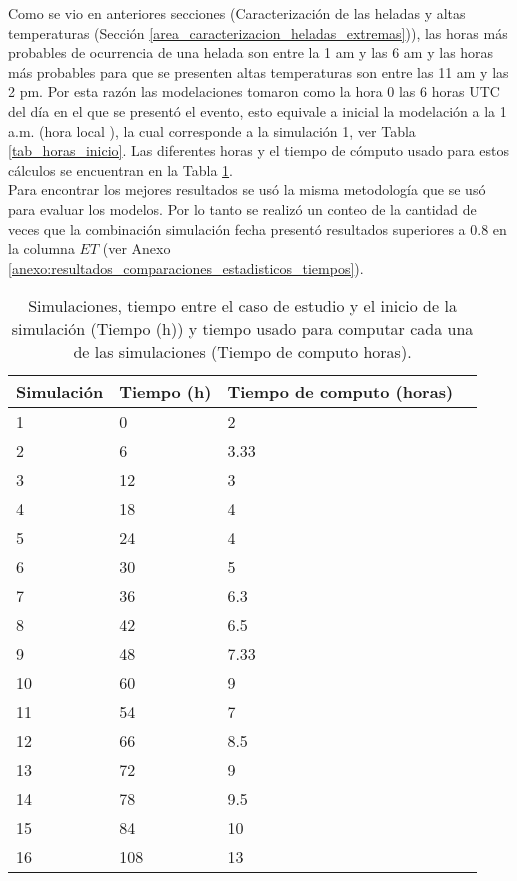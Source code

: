 Como se vio en anteriores secciones (Caracterización de las heladas y altas temperaturas (Sección \ref{area_caracterizacion_heladas_extremas})), las horas más probables de ocurrencia de una helada son entre la 1 am y las 6 am y las horas más probables para que se presenten altas temperaturas son entre las 11 am y las 2 pm. Por esta razón las modelaciones tomaron como la hora 0 las 6 horas UTC del día en el que se presentó el evento, esto equivale a inicial la modelación a la 1 a.m. (hora local ), la cual corresponde a la simulación 1, ver Tabla \ref{tab_horas_inicio}. Las diferentes horas y el tiempo de cómputo usado para estos cálculos se encuentran en la Tabla \ref{tabla:tiempos_inicializacion}.\\

Para encontrar los mejores resultados se usó la misma metodología que se usó para evaluar los modelos. Por lo tanto se realizó un conteo de la cantidad de veces que la combinación simulación fecha presentó resultados superiores a 0.8 en la columna $ET$ (ver Anexo \ref{anexo:resultados_comparaciones_estadisticos_tiempos}).\\

\begin{table}[]
\centering
\caption{Simulaciones, tiempo entre el caso de estudio y el inicio de la simulación (Tiempo (h)) y tiempo usado para computar cada una de las simulaciones (Tiempo de computo horas).}
\label{tabla:tiempos_inicializacion}
\begin{tabular}{llll}
Simulación    & Tiempo (h)    & Tiempo de computo (horas) \\ \hline
  1   &  0            &     2           \\
  2   &  6            &     3.33           \\
  3   &  12           &     3           \\
  4   &  18           &     4           \\ 
  5   &  24           &     4           \\ 
  6   &  30           &     5           \\ 
  7   &  36           &     6.3          \\ 
  8  &  42           &     6.5          \\ 
 9   &  48           &     7.33          \\
 10   &  60           &     9          \\
  11  &  54           &     7          \\
   12 & 66           &     8.5          \\
   13 &  72         &     9          \\
  14  &  78         &     9.5          \\
  15  &  84           &     10           \\
  16  &  108          &     13           \\


            


 
\end{tabular}
\end{table}



